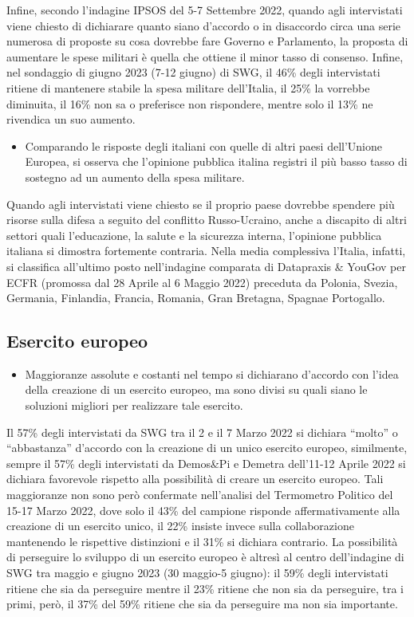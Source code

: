 \documentclass[
  openany]{book}
\providecommand{\tightlist}{%
  \setlength{\itemsep}{0pt}\setlength{\parskip}{0pt}}
\begin{document}
Infine, secondo l'indagine IPSOS del 5-7 Settembre 2022, quando agli intervistati viene chiesto di dichiarare quanto siano d'accordo o in disaccordo circa una serie numerosa di proposte su cosa dovrebbe fare Governo e Parlamento, la proposta di aumentare le spese militari è quella che ottiene il minor tasso di consenso. Infine, nel sondaggio di giugno 2023 (7-12 giugno) di SWG, il 46\% degli intervistati ritiene di mantenere stabile la spesa militare dell'Italia, il 25\% la vorrebbe diminuita, il 16\% non sa o preferisce non rispondere, mentre solo il 13\% ne rivendica un suo aumento.

\begin{itemize}
\tightlist
\item
  Comparando le risposte degli italiani con quelle di altri paesi dell'Unione Europea, si osserva che l'opinione pubblica italina registri il più basso tasso di sostegno ad un aumento della spesa militare.
\end{itemize}

Quando agli intervistati viene chiesto se il proprio paese dovrebbe spendere più risorse sulla difesa a seguito del conflitto Russo-Ucraino, anche a discapito di altri settori quali l'educazione, la salute e la sicurezza interna, l'opinione pubblica italiana si dimostra fortemente contraria. Nella media complessiva l'Italia, infatti, si classifica all'ultimo posto nell'indagine comparata di Datapraxis \& YouGov per ECFR (promossa dal 28 Aprile al 6 Maggio 2022) preceduta da Polonia, Svezia, Germania, Finlandia, Francia, Romania, Gran Bretagna, Spagnae Portogallo.

\hypertarget{esercito-europeo}{%
\subsection{Esercito europeo}\label{esercito-europeo}}

\begin{itemize}
\tightlist
\item
  Maggioranze assolute e costanti nel tempo si dichiarano d'accordo con l'idea della creazione di un esercito europeo, ma sono divisi su quali siano le soluzioni migliori per realizzare tale esercito.
\end{itemize}

Il 57\% degli intervistati da SWG tra il 2 e il 7 Marzo 2022 si dichiara ``molto'' o ``abbastanza'' d'accordo con la creazione di un unico esercito europeo, similmente, sempre il 57\% degli intervistati da Demos\&Pi e Demetra dell'11-12 Aprile 2022 si dichiara favorevole rispetto alla possibilità di creare un esercito europeo. Tali maggioranze non sono però confermate nell'analisi del Termometro Politico del 15-17 Marzo 2022, dove solo il 43\% del campione risponde affermativamente alla creazione di un esercito unico, il 22\% insiste invece sulla collaborazione mantenendo le rispettive distinzioni e il 31\% si dichiara contrario. La possibilità di perseguire lo sviluppo di un esercito europeo è altresì al centro dell'indagine di SWG tra maggio e giugno 2023 (30 maggio-5 giugno): il 59\% degli intervistati ritiene che sia da perseguire mentre il 23\% ritiene che non sia da perseguire, tra i primi, però, il 37\% del 59\% ritiene che sia da perseguire ma non sia importante.
\end{document}
